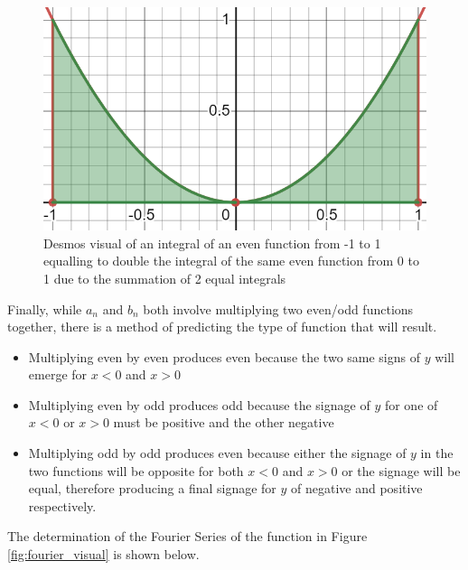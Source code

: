 \documentclass[letterpaper, 12pt]{article}
\begin{document}
\begin{figure}[H]
    \centering
    \includegraphics[width=.6\textwidth]{even.png}
    \caption{Desmos visual of an integral of an even function from -1 to 1 equalling to double the integral of the same even function from 0 to 1 due to the summation of 2 equal integrals}
    \label{fig:even}
\end{figure}

Finally, while \(a_n\) and \(b_n\) both involve multiplying
two even/odd functions together, there is a method of
predicting the type of function that will result.

\begin{itemize}
    \item Multiplying even by even produces even because the two same signs of \(y\) will emerge for \(x < 0\) and \(x > 0\)
    \item Multiplying even by odd produces odd because the signage of \(y\) for one of \(x < 0\) or \(x > 0\) must be positive and the other negative
    \item Multiplying odd by odd produces even because either the signage of \(y\) in the two functions will be opposite for both \(x < 0\) and \(x > 0\) or the signage will be equal, therefore producing a final signage for \(y\) of negative and positive respectively.
\end{itemize}

The determination of the Fourier Series of the function in Figure \ref*{fig:fourier_visual}
is shown below.
\end{document}
